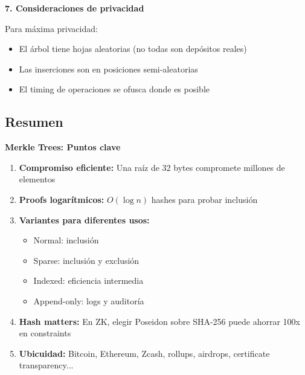 \documentclass[11pt,a4paper,twoside,openright]{book}
\theoremstyle{definition}
\theoremstyle{plain}
\theoremstyle{remark}
\begin{document}
\begin{bancozk}
\textbf{7. Consideraciones de privacidad}

Para máxima privacidad:
\begin{itemize}
    \item El árbol tiene hojas aleatorias (no todas son depósitos reales)
    \item Las inserciones son en posiciones semi-aleatorias
    \item El timing de operaciones se ofusca donde es posible
\end{itemize}
\end{bancozk}

\subsection{Resumen}

\begin{keyidea}
\textbf{Merkle Trees: Puntos clave}

\begin{enumerate}
    \item \textbf{Compromiso eficiente:} Una raíz de 32 bytes compromete millones de elementos
    
    \item \textbf{Proofs logarítmicos:} $O(\log n)$ hashes para probar inclusión
    
    \item \textbf{Variantes para diferentes usos:}
    \begin{itemize}
        \item Normal: inclusión
        \item Sparse: inclusión y exclusión
        \item Indexed: eficiencia intermedia
        \item Append-only: logs y auditoría
    \end{itemize}
    
    \item \textbf{Hash matters:} En ZK, elegir Poseidon sobre SHA-256 puede ahorrar 100x en constraints
    
    \item \textbf{Ubicuidad:} Bitcoin, Ethereum, Zcash, rollups, airdrops, certificate transparency...
\end{enumerate}
\end{keyidea}
\end{document}
